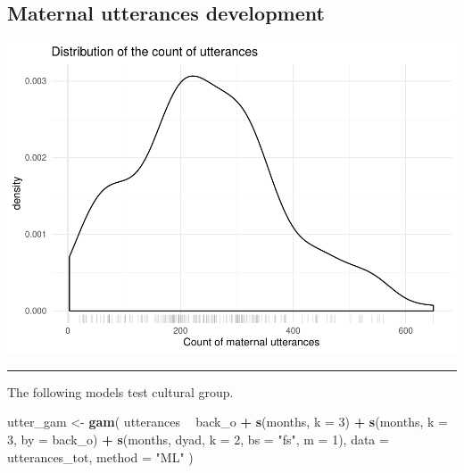 \documentclass[]{article}
\newenvironment{Shaded}{\begin{snugshade}}{\end{snugshade}}
\newcommand{\DataTypeTok}[1]{\textcolor[rgb]{0.13,0.29,0.53}{#1}}
\newcommand{\DecValTok}[1]{\textcolor[rgb]{0.00,0.00,0.81}{#1}}
\newcommand{\FloatTok}[1]{\textcolor[rgb]{0.00,0.00,0.81}{#1}}
\newcommand{\KeywordTok}[1]{\textcolor[rgb]{0.13,0.29,0.53}{\textbf{#1}}}
\newcommand{\NormalTok}[1]{#1}
\newcommand{\OperatorTok}[1]{\textcolor[rgb]{0.81,0.36,0.00}{\textbf{#1}}}
\newcommand{\StringTok}[1]{\textcolor[rgb]{0.31,0.60,0.02}{#1}}
\begin{document}
\hypertarget{maternal-utterances-development}{%
\subsection{Maternal utterances
development}\label{maternal-utterances-development}}

\begin{Shaded}
\end{Shaded}

\includegraphics{supplement_files/figure-latex/utterances-1.pdf}

\begin{center}\rule{0.5\linewidth}{\linethickness}\end{center}

The following models test cultural group.

\begin{Shaded}
\begin{Highlighting}[]
\NormalTok{utter_gam <-}\StringTok{ }\KeywordTok{gam}\NormalTok{(}
\NormalTok{  utterances }\OperatorTok{~}
\StringTok{    }\NormalTok{back_o }\OperatorTok{+}
\StringTok{    }\KeywordTok{s}\NormalTok{(months, }\DataTypeTok{k =} \DecValTok{3}\NormalTok{) }\OperatorTok{+}
\StringTok{    }\KeywordTok{s}\NormalTok{(months, }\DataTypeTok{k =} \DecValTok{3}\NormalTok{, }\DataTypeTok{by =}\NormalTok{ back_o) }\OperatorTok{+}
\StringTok{    }\KeywordTok{s}\NormalTok{(months, dyad, }\DataTypeTok{k =} \DecValTok{2}\NormalTok{, }\DataTypeTok{bs =} \StringTok{"fs"}\NormalTok{, }\DataTypeTok{m =} \DecValTok{1}\NormalTok{),}
  \DataTypeTok{data =}\NormalTok{ utterances_tot,}
  \DataTypeTok{method =} \StringTok{"ML"}
\NormalTok{)}
\end{Highlighting}
\end{Shaded}
\end{document}
